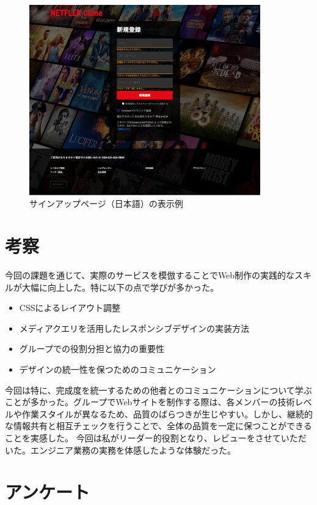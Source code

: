 \documentclass[12pt,a4j]{jarticle}
\begin{document}
\begin{figure}[htbp]
\begin{center}
\includegraphics[width=10cm]{sign_up.png}
\caption{サインアップページ（日本語）の表示例}\label{fig4}
\end{center}
\end{figure}

\section{考察}
今回の課題を通じて、実際のサービスを模倣することでWeb制作の実践的なスキルが大幅に向上した。特に以下の点で学びが多かった。

\begin{itemize}
\item CSSによるレイアウト調整
\item メディアクエリを活用したレスポンシブデザインの実装方法
\item グループでの役割分担と協力の重要性
\item デザインの統一性を保つためのコミュニケーション
\end{itemize}

今回は特に、完成度を統一するための他者とのコミュニケーションについて学ぶことが多かった。グループでWebサイトを制作する際は、各メンバーの技術レベルや作業スタイルが異なるため、品質のばらつきが生じやすい。しかし、継続的な情報共有と相互チェックを行うことで、全体の品質を一定に保つことができることを実感した。
今回は私がリーダー的役割となり、レビューをさせていただいた。エンジニア業務の実務を体感したような体験だった。

\section{アンケート}
\end{document}
